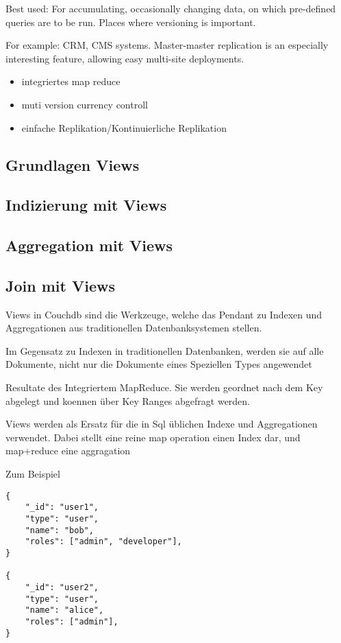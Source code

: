 Best used: For accumulating, occasionally changing data, on which pre-defined queries are to be run. Places where versioning is important.

For example: CRM, CMS systems. Master-master replication is an especially interesting feature, allowing easy multi-site deployments. 


\begin{itemize}
\item integriertes map reduce
\item muti version currency controll
\item einfache Replikation/Kontinuierliche Replikation
\end{itemize}


\subsection{Grundlagen Views}
\subsection{Indizierung mit Views}
\subsection{Aggregation mit Views}
\subsection{Join mit Views}



Views in Couchdb sind die Werkzeuge,
welche das Pendant zu Indexen und Aggregationen
aus traditionellen Datenbanksystemen stellen.

Im Gegensatz zu Indexen in traditionellen Datenbanken, werden sie auf alle Dokumente,
nicht nur die Dokumente eines Speziellen Types angewendet


Resultate des Integriertem MapReduce.
Sie werden geordnet nach dem Key abgelegt und koennen über Key Ranges abgefragt werden.


Views werden als Ersatz für die in Sql üblichen Indexe und Aggregationen verwendet.
Dabei stellt eine  reine map operation einen Index dar, und map+reduce eine aggragation

\newpage
Zum Beispiel
\begin{verbatim}
{
    "_id": "user1",
    "type": "user",
    "name": "bob",
    "roles": ["admin", "developer"],
}

{
    "_id": "user2",
    "type": "user",
    "name": "alice",
    "roles": ["admin"],
}
\end{verbatim}


